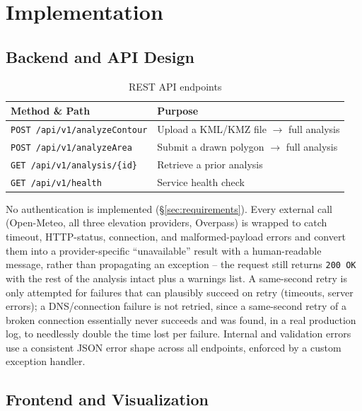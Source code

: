 \documentclass[manuscript,screen]{acmart}
\begin{document}
\section{Implementation}
\label{sec:implementation}

\subsection{Backend and API Design}

\begin{table}[h]
  \caption{REST API endpoints}
  \label{tab:endpoints}
  \begin{tabular}{p{5.2cm}p{2.0cm}}
    \toprule
    Method \& Path & Purpose \\
    \midrule
    \texttt{POST /api/v1/analyzeContour} & Upload a KML/KMZ file $\to$ full analysis \\
    \texttt{POST /api/v1/analyzeArea} & Submit a drawn polygon $\to$ full analysis \\
    \texttt{GET /api/v1/analysis/\{id\}} & Retrieve a prior analysis \\
    \texttt{GET /api/v1/health} & Service health check \\
    \bottomrule
  \end{tabular}
\end{table}

No authentication is implemented (\S\ref{sec:requirements}). Every
external call (Open-Meteo, all three elevation providers, Overpass) is
wrapped to catch timeout, HTTP-status, connection, and malformed-payload
errors and convert them into a provider-specific ``unavailable'' result
with a human-readable message, rather than propagating an exception -- the
request still returns \texttt{200 OK} with the rest of the analysis intact
plus a warnings list. A same-second retry is only attempted for failures
that can plausibly succeed on retry (timeouts, server errors); a
DNS/connection failure is not retried, since a same-second retry of a
broken connection essentially never succeeds and was found, in a real
production log, to needlessly double the time lost per failure. Internal
and validation errors use a consistent JSON error shape across all
endpoints, enforced by a custom exception handler.

\subsection{Frontend and Visualization}
\end{document}
